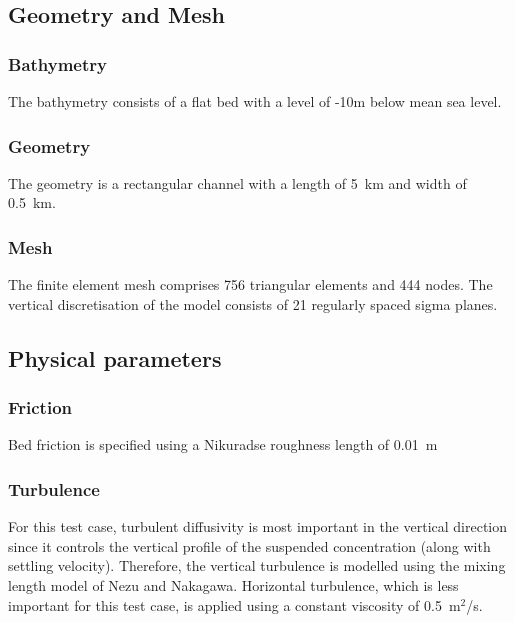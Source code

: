 \subsection{Geometry and Mesh}
%
\subsubsection{Bathymetry}
%
The bathymetry consists of a flat bed with a level of -10m below
mean sea level.
%
\subsubsection{Geometry}
%
The geometry is a rectangular channel with a length of 5~km and
width of 0.5~km.
%
\subsubsection{Mesh}
%
The finite element mesh comprises 756 triangular elements and
444 nodes. The vertical discretisation of the model consists of
21 regularly spaced sigma planes.
%
%
%
\subsection{Physical parameters}
%
\subsubsection{Friction}
Bed friction is specified using a Nikuradse roughness length of 0.01~m

\subsubsection{Turbulence}
For this test case, turbulent diffusivity is most important in the
vertical direction since it controls the vertical profile of the
suspended concentration (along with settling velocity). Therefore, the
vertical turbulence is modelled using the mixing length model of Nezu
and Nakagawa. Horizontal turbulence, which is less important for this
test case, is applied using a constant viscosity of 0.5~m$^2$/s.

